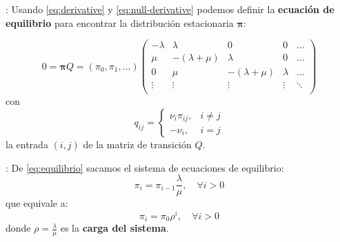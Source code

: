 \documentclass{beamer}
\begin{document}
\begin{frame}{\secname: \subsecname}
    Usando \eqref{eq:derivative}
    y \eqref{eq:null-derivative} podemos
    definir la \textbf{ecuación de equilibrio}
    para encontrar la distribución estacionaria
    $\pmb{\pi}$:

    \begin{equation}
        0 = \pmb{\pi}Q = 
        (\pi_0, \pi_1, \ldots)
        \begin{pmatrix}
            -\lambda & \lambda & 0 & 0 & \ldots \\
            \mu & -(\lambda+\mu) & \lambda & 0 & \ldots \\
            0  & \mu & -(\lambda+\mu) & \lambda &  \ldots \\
            \vdots  & \vdots & \vdots & \vdots &  \ddots \\
        \end{pmatrix}
        \label{eq:equilibrio}
    \end{equation}
    con
    \begin{equation}
        q_{ij}=
        \begin{cases}
            \nu_i \pi_{i j}, & i\neq j\\
            -\nu_i, & i=j
        \end{cases}
    \end{equation}
    la entrada
    $(i,j)$ de la matriz de transición $Q$.

\end{frame}






\begin{frame}{\secname: \subsecname}
    De \eqref{eq:equilibrio} sacamos
    el sistema de ecuaciones de equilibrio:
    \begin{equation}
        \pi_i = \pi_{i-1} \frac{\lambda}{\mu},
        \quad \forall i>0
        \label{eq:sistema_equilibrio}
    \end{equation}
    que equivale a:
    \begin{equation}
        \pi_i = \pi_0 \rho^i, \quad \forall i>0
        \label{eq:sistema_equilibrio-potencia}
    \end{equation}
    donde $\rho=\tfrac{\lambda}{\mu}$
    es la \textbf{carga del sistema}.
\end{frame}
\end{document}
